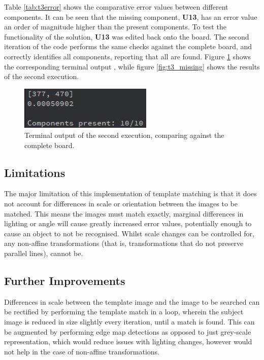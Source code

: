 \documentclass[conference]{IEEEtran}
\begin{document}
Table \ref{tab:t3error} shows the comparative error values between different components. It can be seen that the missing component, \textbf{U13}, has an error value an order of magnitude higher than the present components. To test the functionality of the solution, \textbf{U13} was edited back onto the board. The second iteration of the code performs the same checks against the complete board, and correctly identifies all components, reporting that all are found. Figure \ref{t3_outputTerminal2} shows the corresponding terminal output , while figure \ref{fig:t3_missing} shows the results of the second execution.

\begin{figure}[H]
\centering
\includegraphics[width=2.5in]{t3_outputTerminal2}
\caption{Terminal output of the second execution, comparing against the complete board.}
\label{t3_outputTerminal2}
\end{figure}
\subsection{Limitations}
The major limitation of this implementation of template matching is that it does not account for differences in scale or orientation between the images to be matched. This means the images must match exactly, marginal differences in lighting or angle will cause greatly increased error values, potentially enough to cause an object to not be recognised. Whilst scale changes can be controlled for, any non-affine transformations (that is, transformations that do not preserve parallel lines), cannot be. 
\subsection{Further Improvements}
Differences in scale between the template image and the image to be searched can be rectified by performing the template match in a loop, wherein the subject image is reduced in size slightly every iteration, until a match is found. This can be augmented by performing edge map detections as opposed to just grey-scale representation, which would reduce issues with lighting changes, however would not help in the case of non-affine transformations\cite{MultiscaleDetection}.
\end{document}

